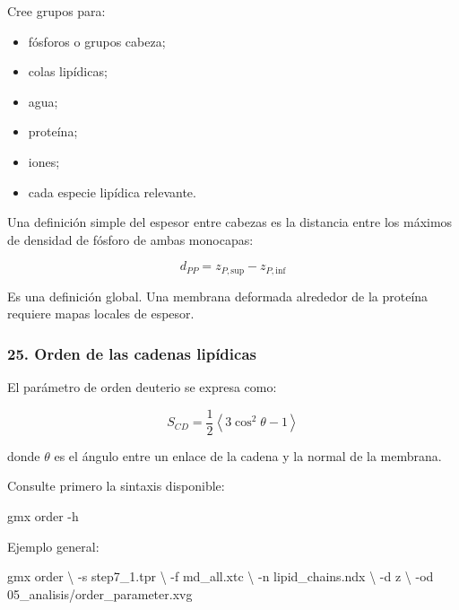 \documentclass[
  spanish,
  11pt,
  a4paper]{article}
\newenvironment{Shaded}{\begin{snugshade}}{\end{snugshade}}
\newcommand{\AttributeTok}[1]{\textcolor[rgb]{0.13,0.29,0.53}{#1}}
\newcommand{\DataTypeTok}[1]{\textcolor[rgb]{0.13,0.29,0.53}{#1}}
\newcommand{\ExtensionTok}[1]{#1}
\newcommand{\NormalTok}[1]{#1}
\providecommand{\tightlist}{%
  \setlength{\itemsep}{0pt}\setlength{\parskip}{0pt}}
\begin{document}
Cree grupos para:

\begin{itemize}
\tightlist
\item
  fósforos o grupos cabeza;
\item
  colas lipídicas;
\item
  agua;
\item
  proteína;
\item
  iones;
\item
  cada especie lipídica relevante.
\end{itemize}

Una definición simple del espesor entre cabezas es la distancia entre
los máximos de densidad de fósforo de ambas monocapas:

\[
d_{PP}=z_{P,\mathrm{sup}}-z_{P,\mathrm{inf}}
\]

Es una definición global. Una membrana deformada alrededor de la
proteína requiere mapas locales de espesor.

\subsubsection{25. Orden de las cadenas
lipídicas}\label{orden-de-las-cadenas-lipuxeddicas}

El parámetro de orden deuterio se expresa como:

\[
S_{CD}=
\frac{1}{2}
\left\langle 3\cos^2\theta-1 \right\rangle
\]

donde \(\theta\) es el ángulo entre un enlace de la cadena y la normal
de la membrana.

Consulte primero la sintaxis disponible:

\begin{Shaded}
\begin{Highlighting}[]
\ExtensionTok{gmx}\NormalTok{ order }\AttributeTok{{-}h}
\end{Highlighting}
\end{Shaded}

Ejemplo general:

\begin{Shaded}
\begin{Highlighting}[]
\ExtensionTok{gmx}\NormalTok{ order }\DataTypeTok{\textbackslash{}}
    \AttributeTok{{-}s}\NormalTok{ step7\_1.tpr }\DataTypeTok{\textbackslash{}}
    \AttributeTok{{-}f}\NormalTok{ md\_all.xtc }\DataTypeTok{\textbackslash{}}
    \AttributeTok{{-}n}\NormalTok{ lipid\_chains.ndx }\DataTypeTok{\textbackslash{}}
    \AttributeTok{{-}d}\NormalTok{ z }\DataTypeTok{\textbackslash{}}
    \AttributeTok{{-}od}\NormalTok{ 05\_analisis/order\_parameter.xvg}
\end{Highlighting}
\end{Shaded}
\end{document}
